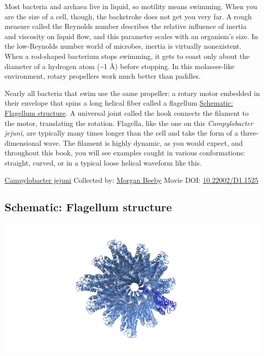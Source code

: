 \documentclass[]{tufte-book}
\begin{document}
Most bacteria and archaea live in liquid, so motility means swimming. When you are the size of a cell, though, the backstroke does not get you very far. A rough measure called the Reynolds number describes the relative influence of inertia and viscosity on liquid flow, and this parameter scales with an organism's size. In the low-Reynolds number world of microbes, inertia is virtually nonexistent. When a rod-shaped bacterium stops swimming, it gets to coast only about the diameter of a hydrogen atom (\textasciitilde{}1 Å) before stopping. In this molasses-like environment, rotary propellers work much better than paddles.

Nearly all bacteria that swim use the same propeller: a rotary motor embedded in their envelope that spins a long helical fiber called a flagellum \protect\hyperlink{Flagellum_structure}{Schematic: Flagellum structure}. A universal joint called the hook connects the filament to the motor, translating the rotation. Flagella, like the one on this \emph{Campylobacter jejuni}, are typically many times longer than the cell and take the form of a three-dimensional wave. The filament is highly dynamic, as you would expect, and throughout this book, you will see examples caught in various conformations: straight, curved, or in a typical loose helical waveform like this.



\hypertarget{htmlwidget-99e15df2ac3d9a4461be}{}

\label{fig:6-1}\protect\hyperlink{tree}{Campylobacter jejuni} Collected by: \protect\hyperlink{morgan_beeby}{Morgan Beeby} Movie DOI: \href{https://doi.org/10.22002/D1.1525}{10.22002/D1.1525}

\hypertarget{Flagellum_structure}{%
\subsection*{Schematic: Flagellum structure}\label{Flagellum_structure}}

\includegraphics{img/schematics/6_1_1}
\end{document}
